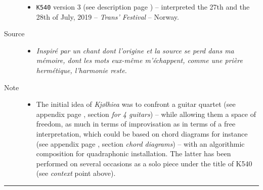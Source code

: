 \begin{description}
\begin{itemize}
\item \texttt{K540} version 3 (see description page \pageref{k540v3}) -- interpreted the 27th and the 28th of July, 2019 -- \textit{Trans' Festival}  -- Norway.
\end{itemize}
\item[Source] \hfill 
\begin{itemize}
\item[] \textit{Inspir\'{e} par un chant dont l'origine et la source se perd dans ma m\'{e}moire, dont les mots eux-m\^{e}me m'\'{e}chappent, comme une pri\`{e}re herm\'{e}tique, l'harmonie reste.}
\end{itemize}
\bigskip
\bigskip
\item[Note] \hfill 
\begin{itemize}
\item[]  The initial idea of \textsl{Kj{\o}lhiea} was to confront a guitar quartet (see appendix page \pageref{kjccqg}, section \textsl{for 4 guitars}) -- while allowing them a space of freedom, as much in terms of improvisation as in terms of a free interpretation, which could be based on chord diagrams for instance (see appendix page \pageref{kjcccc}, section \textsl{chord diagrams}) -- with an algorithmic composition for quadraphonic installation. The latter has been performed on several occasions as a solo piece under the title of K540 (see \textsl{context} point above).
\end{itemize}

\end{description}


\bigskip

\begin{center}\rule{0.5\linewidth}{0.5pt}\end{center}

\bigskip

